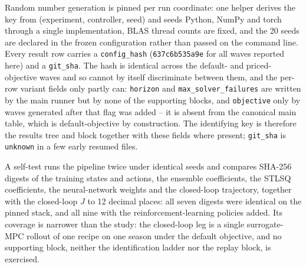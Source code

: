 Random number generation is pinned per run coordinate: one helper derives the key from
(experiment, controller, seed) and seeds Python, NumPy and torch through a single
implementation, BLAS thread counts are fixed, and the 20 seeds are declared in the frozen
configuration rather than passed on the command line. Every result row carries a
\texttt{config\_hash} (\texttt{637c6b535a9e} for all waves reported here) and a
\texttt{git\_sha}. The hash is identical across the default- and priced-objective waves and
so cannot by itself discriminate between them, and the per-row variant fields only partly
can: \texttt{horizon} and \texttt{max\_solver\_failures} are written by the main runner but
by none of the supporting blocks, and \texttt{objective} only by waves generated after that
flag was added -- it is absent from the canonical main table, which is default-objective by
construction. The identifying key is therefore the results tree and block together with
these fields where present; \texttt{git\_sha} is \texttt{unknown} in a few early resumed
files.

A self-test runs the pipeline twice under identical seeds and compares SHA-256 digests of
the training states and actions, the ensemble coefficients, the STLSQ coefficients, the
neural-network weights and the closed-loop trajectory, together with the closed-loop $J$ to
12 decimal places: all seven digests were identical on the pinned stack, and all nine
with the reinforcement-learning policies added. Its coverage is narrower than the study:
the closed-loop leg is a single surrogate-MPC rollout of one recipe on one season under the
default objective, and no supporting block, neither the identification ladder nor the
replay block, is exercised.

